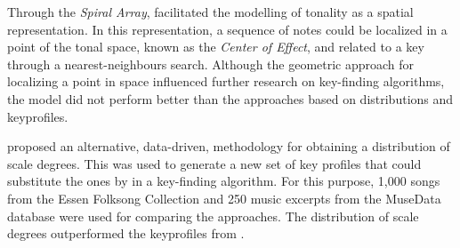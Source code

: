 
Through the \emph{Spiral Array}, \textcite{chew2002spiral}
facilitated the modelling of tonality as a spatial
representation. In this representation, a sequence of notes
could be localized in a point of the tonal space, known as
the \emph{Center of Effect}, and related to a key through a
nearest-neighbours search. Although the geometric approach
for localizing a point in space influenced further research
on key-finding algorithms, the model did not perform better
than the approaches based on distributions and
\gls{keyprofile}s.

\textcite{aarden2003dynamic} proposed an alternative,
data-driven, methodology for obtaining a distribution of
scale degrees. This was used to generate a new set of key
profiles that could substitute the ones by
\textcite{krumhansl1982tracing} in a key-finding algorithm.
For this purpose, 1,000 songs from the Essen Folksong
Collection and 250 music excerpts from the MuseData database
were used for comparing the approaches. The distribution of
scale degrees outperformed the \gls{keyprofile}s from
\textcite{krumhansl1982tracing}.




